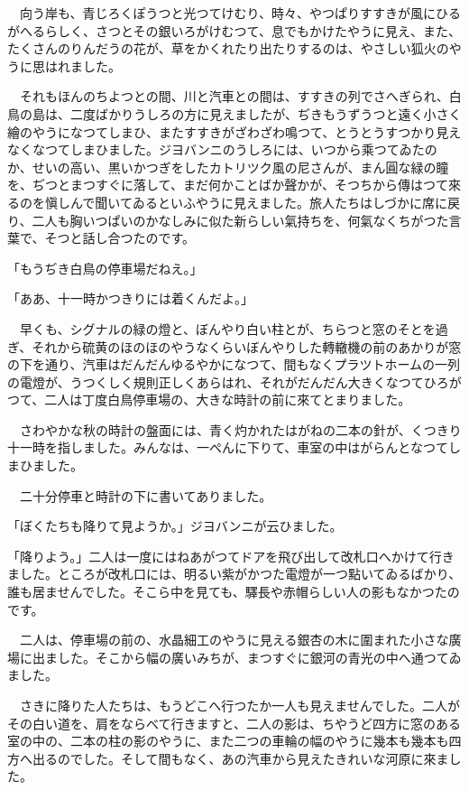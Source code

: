 \documentclass[tate,paper=b6j,jafontsize=9pt]{jlreq}
\begin{document}
　向う岸も、青じろくぽうつと光つてけむり、時々、やつぱりすすきが風にひるがへるらしく、さつとその銀いろがけむつて、息でもかけたやうに見え、また、たくさんのりんだうの花が、草をかくれたり出たりするのは、やさしい狐火のやうに思はれました。

　それもほんのちよつとの間、川と汽車との間は、すすきの列でさへぎられ、白鳥の島は、二度ばかりうしろの方に見えましたが、ぢきもうずうつと遠く小さく繪のやうになつてしまひ、またすすきがざわざわ鳴つて、とうとうすつかり見えなくなつてしまひました。ジヨバンニのうしろには、いつから乘つてゐたのか、せいの高い、黒いかつぎをしたカトリツク風の尼さんが、まん圓な緑の瞳を、ぢつとまつすぐに落して、まだ何かことばか聲かが、そつちから傳はつて來るのを愼しんで聞いてゐるといふやうに見えました。旅人たちはしづかに席に戻り、二人も胸いつぱいのかなしみに似た新らしい氣持ちを、何氣なくちがつた言葉で、そつと話し合つたのです。

「もうぢき白鳥の停車場だねえ。」

「ああ、十一時かつきりには着くんだよ。」

　早くも、シグナルの緑の燈と、ぼんやり白い柱とが、ちらつと窓のそとを過ぎ、それから硫黄のほのほのやうなくらいぼんやりした轉轍機の前のあかりが窓の下を通り、汽車はだんだんゆるやかになつて、間もなくプラツトホームの一列の電燈が、うつくしく規則正しくあらはれ、それがだんだん大きくなつてひろがつて、二人は丁度白鳥停車場の、大きな時計の前に來てとまりました。

　さわやかな秋の時計の盤面には、青く灼かれたはがねの二本の針が、くつきり十一時を指しました。みんなは、一ぺんに下りて、車室の中はがらんとなつてしまひました。

　二十分停車と時計の下に書いてありました。

「ぼくたちも降りて見ようか。」ジヨバンニが云ひました。

「降りよう。」二人は一度にはねあがつてドアを飛び出して改札口へかけて行きました。ところが改札口には、明るい紫がかつた電燈が一つ點いてゐるばかり、誰も居ませんでした。そこら中を見ても、驛長や赤帽らしい人の影もなかつたのです。

　二人は、停車場の前の、水晶細工のやうに見える銀杏の木に圍まれた小さな廣場に出ました。そこから幅の廣いみちが、まつすぐに銀河の青光の中へ通つてゐました。

　さきに降りた人たちは、もうどこへ行つたか一人も見えませんでした。二人がその白い道を、肩をならべて行きますと、二人の影は、ちやうど四方に窓のある室の中の、二本の柱の影のやうに、また二つの車輪の幅のやうに幾本も幾本も四方へ出るのでした。そして間もなく、あの汽車から見えたきれいな河原に來ました。
\end{document}
